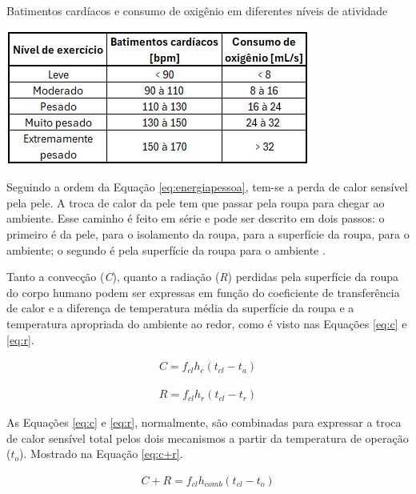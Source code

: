\documentclass[acronym,symbols,table]{fei}
\begin{document}
\begin{table}[!htb] 
 \centering
    \caption{Batimentos cardíacos e consumo de oxigênio em diferentes níveis de atividade}
    \includegraphics[width=0.5\linewidth]{Tabelas/bpm-o2.jpeg}
    \label{tab: bpm e o2}
\end{table}

Seguindo a ordem da Equação \ref{eq:energiapessoa}, tem-se a perda de calor sensível pela pele. A troca de calor da pele tem que passar pela roupa para chegar ao ambiente. Esse caminho é feito em série e pode ser descrito em dois passos: o primeiro é da pele, para o isolamento da roupa, para a superfície da roupa, para o ambiente; o segundo é pela superfície da roupa para o ambiente \cite{ASHRAE2009}.

Tanto a convecção (\textit{C}), quanto a radiação (\textit{R}) perdidas pela superfície da roupa do corpo humano podem ser expressas em função do coeficiente de transferência de calor e a diferença de temperatura média da superfície da roupa e a temperatura apropriada do ambiente ao redor, como é visto nas Equações \ref{eq:c} e \ref{eq:r}. 

\begin{equation} \label{eq:c}
    \begin{aligned}
    C = f_{cl} h_{c} (t_{cl} - t_{a})
    \end{aligned}
\end{equation}


\begin{equation} \label{eq:r}
    \begin{aligned}
    R = f_{cl} h_{r} (t_{cl} - t_{r})
    \end{aligned}
\end{equation}

As Equações \ref{eq:c} e \ref{eq:r}, normalmente, são combinadas para expressar a troca de calor sensível total pelos dois mecanismos a partir da temperatura de operação ($t_{o}$). Mostrado na Equação \ref{eq:c+r}.

\begin{equation} \label{eq:c+r}
    \begin{aligned}
    C+R = f_{cl} h_{comb} (t_{cl} - t_{o})
    \end{aligned}
\end{equation}
\end{document}
